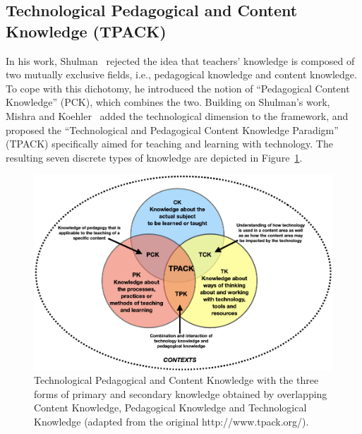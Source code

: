 \documentclass[journal]{IEEEtran}
\begin{document}
\subsection{Technological Pedagogical and Content Knowledge (TPACK)}
\label{subsec:TPACK}

In his work, Shulman~\cite{shulman1986those} rejected the idea that teachers' knowledge is composed of two mutually exclusive fields, i.e., pedagogical knowledge and content knowledge. To cope with this dichotomy, he introduced the notion of ``Pedagogical Content Knowledge'' (PCK), which combines the two.
Building on Shulman's work, Mishra and Koehler~\cite{koehler2009technological} added the technological dimension to the framework, and proposed the ``Technological and Pedagogical Content Knowledge Paradigm'' (TPACK) specifically aimed for teaching and learning with technology. The resulting seven discrete types of knowledge are depicted in Figure~\ref{fig:TPACK}.

\begin{figure}[t]
	\centering
	\includegraphics[width=\columnwidth]{images/TPACK.jpeg}
	\caption{Technological Pedagogical and Content Knowledge with the three forms of primary and secondary knowledge obtained by overlapping Content Knowledge, Pedagogical Knowledge and Technological Knowledge (adapted from the original http://www.tpack.org/).}
	\label{fig:TPACK}       
\end{figure}
\end{document}

